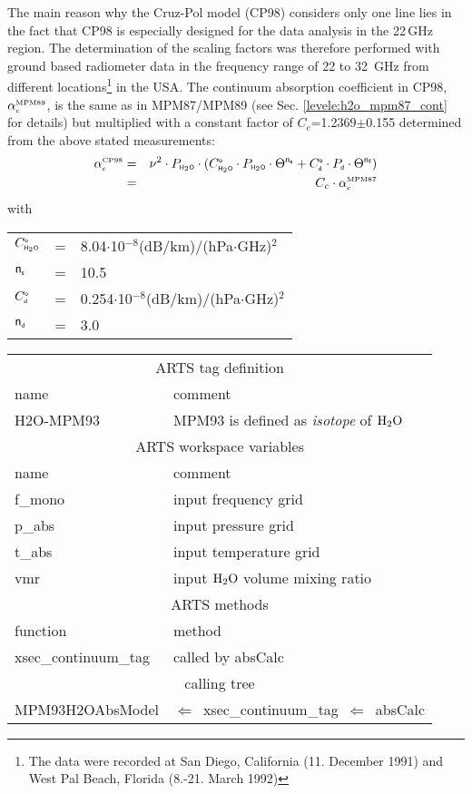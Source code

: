 {The main reason why the Cruz-Pol model (CP98) considers only one line
lies in the fact that CP98 is especially designed for the data analysis
in the 22\,GHz region. The determination of the scaling factors was therefore
performed with ground based radiometer data in the frequency range of
22 to 32 \,GHz from different locations\footnote{The data were
  recorded at San Diego, California (11. December 1991) and West Pal
  Beach, Florida (8.-21. March 1992)} in the USA.
%
\label{levele:cp98_cont}
The continuum absorption coefficient in CP98, $\alpha^{\mbox{\rm \tiny MPM89}}_{\mbox{\tiny c}}$, 
is the same as in MPM87/MPM89 (see Sec. \ref{levele:h2o_mpm87_cont} for 
details) but multiplied with a constant factor of $C_c$=1.2369$\pm$0.155 determined 
from the above stated measurements:\\
\begin{eqnarray} 
  \label{eq:cp98:cont}
  \alpha^{\mbox{\tiny \rm CP98}}_{\mbox{\tiny c}} &=& \nu^2 \cdot P_{\mbox{\tiny \sf H}_{2}\mbox{\tiny \sf O}} \cdot 
                (C^{\mbox{\tiny \sf o}}_{\mbox{\tiny \sf H}_{2}\mbox{\tiny \sf O}} \cdot P_{\mbox{\tiny \sf H}_{2}\mbox{\tiny \sf O}} \cdot \Theta^{{\sf n}_{\mbox{\tiny \sf s}}} + 
                 C^{\mbox{\tiny \sf o}}_{\mbox{\tiny \sf d}} \cdot P_{\mbox{\tiny \sf d}}  \cdot \Theta^{{\sf n}_{\mbox{\tiny \sf f}}})\\
            &=& C_c \cdot \alpha^{\mbox{\rm \tiny MPM87}}_{\mbox{\tiny c}}
\nonumber
\end{eqnarray}
with\\
\begin{tabular}{lcl}
$C^{\mbox{\tiny \sf o}}_{\mbox{\tiny \sf H}_{2}\mbox{\tiny \sf O}}$   & = & 8.04$\cdot$10$^{-8}$(dB/km)/(hPa$\cdot$GHz)$^2$\\
${\sf n}_{\mbox{\tiny \sf s}}$    & = & 10.5\\
$C^{\mbox{\tiny \sf o}}_{\mbox{\tiny \sf d}}$   & = & 0.254$\cdot$10$^{-8}$(dB/km)/(hPa$\cdot$GHz)$^2$\\
${\sf n}_{\mbox{\tiny \sf d}}$    & = & 3.0\\
\end{tabular}
%
%
\begin{center}
\begin{tabular}{ll}
\hline
\multicolumn{2}{c}{ARTS tag definition}\\
name      & comment \\
H2O-MPM93 & MPM93 is defined as {\it isotope} of $\mbox{H}_2\mbox{O}$\\
\hline
\multicolumn{2}{c}{ARTS workspace variables}\\
name & comment \\
 f\_mono & input frequency grid \\
 p\_abs  & input pressure grid \\
 t\_abs  & input temperature grid\\
 vmr    & input $\mbox{H}_2\mbox{O}$ volume mixing ratio\\
\hline
\multicolumn{2}{c}{ARTS methods}\\
function           & method\\
xsec\_continuum\_tag & called by absCalc \\
\hline
\multicolumn{2}{c}{calling tree}\\
MPM93H2OAbsModel & $\Leftarrow$~xsec\_continuum\_tag~$\Leftarrow$~absCalc\\
\end{tabular}
\end{center}

}
